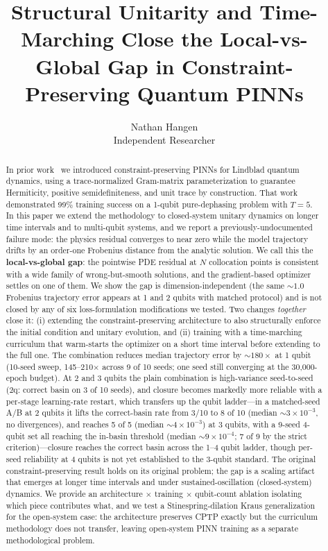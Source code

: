 \documentclass[11pt]{article}
\title{Structural Unitarity and Time-Marching Close the Local-vs-Global Gap in Constraint-Preserving Quantum PINNs}
\author{Nathan Hangen \\ Independent Researcher}
\date{}
\begin{document}
\maketitle

\begin{abstract}

In prior work~\cite{hangen2024constraint} we introduced constraint-preserving PINNs for Lindblad quantum dynamics, using a trace-normalized Gram-matrix parameterization to guarantee Hermiticity, positive semidefiniteness, and unit trace by construction. That work demonstrated 99\% training success on a 1-qubit pure-dephasing problem with $T = 5$. In this paper we extend the methodology to closed-system unitary dynamics on longer time intervals and to multi-qubit systems, and we report a previously-undocumented failure mode: the physics residual converges to near zero while the model trajectory drifts by an order-one Frobenius distance from the analytic solution. We call this the \textbf{local-vs-global gap}: the pointwise PDE residual at $N$ collocation points is consistent with a wide family of wrong-but-smooth solutions, and the gradient-based optimizer settles on one of them. We show the gap is dimension-independent (the same $\sim 1.0$ Frobenius trajectory error appears at 1 and 2 qubits with matched protocol) and is not closed by any of six loss-formulation modifications we tested. Two changes \emph{together} close it: (i) extending the constraint-preserving architecture to also structurally enforce the initial condition and unitary evolution, and (ii) training with a time-marching curriculum that warm-starts the optimizer on a short time interval before extending to the full one. The combination reduces median trajectory error by $\sim 180\times$ at 1 qubit (10-seed sweep, 145--210$\times$ across 9 of 10 seeds; one seed still converging at the 30{,}000-epoch budget). At 2 and 3 qubits the plain combination is high-variance seed-to-seed (2q: correct basin on 3 of 10 seeds), and closure becomes markedly more reliable with a per-stage learning-rate restart, which transfers up the qubit ladder---in a matched-seed A/B at 2 qubits it lifts the correct-basin rate from 3/10 to 8 of 10 (median $\sim\!3\times10^{-3}$, no divergences), and reaches 5 of 5 (median $\sim\!4\times10^{-3}$) at 3 qubits, with a 9-seed 4-qubit set all reaching the in-basin threshold (median $\sim\!9\times10^{-4}$; 7 of 9 by the strict criterion)---closure reaches the correct basin across the 1--4 qubit ladder, though per-seed reliability at 4 qubits is not yet established to the 3-qubit standard. The original constraint-preserving result holds on its original problem; the gap is a scaling artifact that emerges at longer time intervals and under sustained-oscillation (closed-system) dynamics. We provide an architecture $\times$ training $\times$ qubit-count ablation isolating which piece contributes what, and we test a Stinespring-dilation Kraus generalization for the open-system case: the architecture preserves CPTP exactly but the curriculum methodology does not transfer, leaving open-system PINN training as a separate methodological problem.

\end{abstract}
\end{document}
